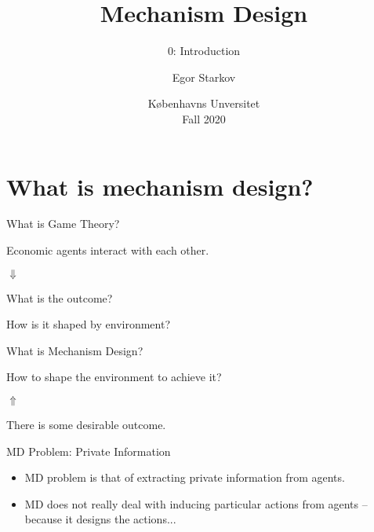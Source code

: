 \documentclass[english,10pt
,aspectratio=169
]{beamer}
\title{Mechanism Design}
\subtitle{0: Introduction}
\author{Egor Starkov}
\date{K{\o}benhavns Unversitet \\
	Fall 2020}
\begin{document}
	\frame[plain]{\titlepage}


\section{What is mechanism design?}

\begin{frame}{What is Game Theory?}
\begin{center}
	Economic agents interact with each other.
	\pause
	
	$\Downarrow$
	
	What is the outcome? 
	
	How is it shaped by environment?
\end{center}
\end{frame}


\begin{frame}{What is Mechanism Design?}
\begin{center}
	\pause[2] 
	How to shape the environment to achieve it?
	
	$\Uparrow$
	
	\pause[1]
	There is some desirable outcome.
\end{center}
\end{frame}


\begin{frame}{MD Problem: Private Information}
\begin{itemize}
	\item MD problem is that of extracting private information from agents.
	
	\item MD does not really deal with inducing particular actions from agents -- because it designs the actions...
\end{itemize}
\end{frame}
\end{document}
